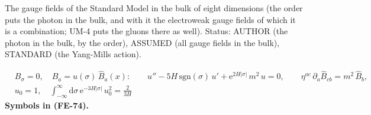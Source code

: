 \documentclass[
  10pt,
]{article}
\begin{document}
The gauge fields of the Standard Model in the bulk of eight dimensions
(the order puts the photon in the bulk, and with it the electroweak
gauge fields of which it is a combination; UM-4 puts the gluons there as
well). Status: AUTHOR (the photon in the bulk, by the order), ASSUMED
(all gauge fields in the bulk), STANDARD (the Yang-Mills action).

\[
\begin{aligned}
&B_\sigma = 0,\quad B_a = u(\sigma)\,\hat B_a(x):\qquad
u'' - 5H\,\mathrm{sgn}(\sigma)\,u' + \mathrm{e}^{2H\lvert\sigma\rvert}\,m^2\,u = 0,\qquad
\eta^{ac}\,\partial_a\hat B_{cb} = m^2\,\hat B_b,\\
&u_0 = 1,\quad \int_{-\infty}^{\infty}\mathrm{d}\sigma\,\mathrm{e}^{-3H\lvert\sigma\rvert}\,u_0^2 = \frac{2}{3H}
\end{aligned} \tag{FE-74}
\] \textbf{Symbols in (FE-74).}
\end{document}

